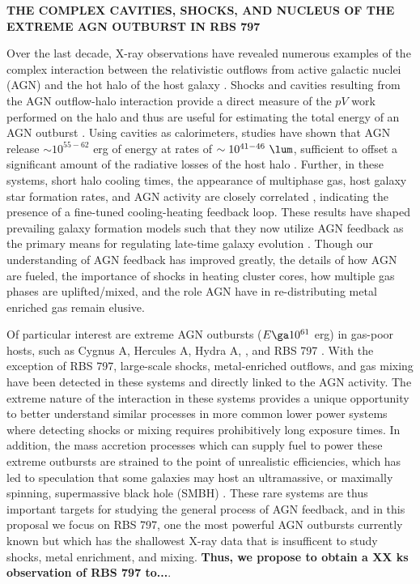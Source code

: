 \documentclass[letterpaper,11pt]{article}
\begin{document}
\pagestyle{plain}

\begin{center}
  {\bf\uppercase{The Complex Cavities, Shocks, and Nucleus of the
      Extreme AGN Outburst in RBS 797}}
\end{center}

Over the last decade, X-ray observations have revealed numerous
examples of the complex interaction between the relativistic outflows
from active galactic nuclei (AGN) and the hot halo of the host galaxy
\cite[\eg][]{hydraa0}. Shocks and cavities resulting from the AGN
outflow-halo interaction provide a direct measure of the $pV$ work
performed on the halo and thus are useful for estimating the total
energy of an AGN outburst \cite[see][for a review]{mcnamrev}. Using
cavities as calorimeters, studies have shown that AGN release $\sim
10^{55-62}$ erg of energy at rates of $\sim 10^{41-46} ~\lum$,
sufficient to offset a significant amount of the radiative losses of
the host halo \cite[\eg][]{birzan04}. Further, in these systems, short
halo cooling times, the appearance of multiphase gas, host galaxy star
formation rates, and AGN activity are closely correlated
\cite{crawford99, edge01, haradent, rafferty06}, indicating the
presence of a fine-tuned cooling-heating feedback loop. These results
have shaped prevailing galaxy formation models such that they now
utilize AGN feedback as the primary means for regulating late-time
galaxy evolution \cite[\eg][]{croton06, bower06}. Though our
understanding of AGN feedback has improved greatly, the details of how
AGN are fueled, the importance of shocks in heating cluster cores, how
multiple gas phases are uplifted/mixed, and the role AGN have in
re-distributing metal enriched gas remain elusive.

Of particular interest are extreme AGN outbursts ($E \ga 10^{61}$ erg)
in gas-poor hosts, such as Cygnus A, Hercules A, Hydra A, \ms, and RBS
797 \cite{2006ApJ...644L...9W, herca, hydraa, ms0735, r797}. With the
exception of RBS 797, large-scale shocks, metal-enriched outflows, and
gas mixing have been detected in these systems and directly linked to
the AGN activity. The extreme nature of the interaction in these
systems provides a unique opportunity to better understand similar
processes in more common lower power systems where detecting shocks or
mixing requires prohibitively long exposure times. In addition, the
mass accretion processes which can supply fuel to power these extreme
outbursts are strained to the point of unrealistic efficiencies, which
has led to speculation that some galaxies may host an ultramassive, or
maximally spinning, supermassive black hole (SMBH) \cite{msspin,
  minaspin}. These rare systems are thus important targets for
studying the general process of AGN feedback, and in this proposal we
focus on RBS 797, one the most powerful AGN outbursts currently known
but which has the shallowest X-ray data that is insufficent to study
shocks, metal enrichment, and mixing. {\bf Thus, we propose to obtain
  a XX ks observation of RBS 797 to...}.\\
\end{document}

